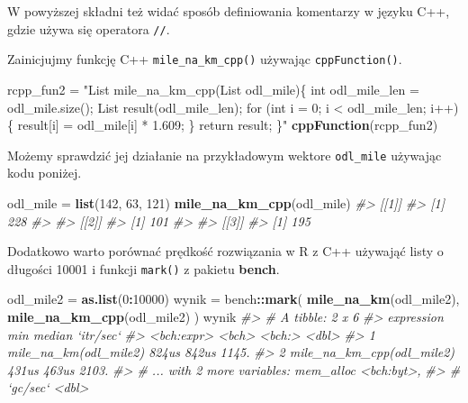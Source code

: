 \documentclass[paper=6in:9in,pagesize=pdftex,headinclude=on,footinclude=on,10pt]{scrbook}
\newenvironment{Shaded}{\begin{snugshade}}{\end{snugshade}}
\newcommand{\CommentTok}[1]{\textcolor[rgb]{0.56,0.35,0.01}{\textit{#1}}}
\newcommand{\DecValTok}[1]{\textcolor[rgb]{0.00,0.00,0.81}{#1}}
\newcommand{\KeywordTok}[1]{\textcolor[rgb]{0.13,0.29,0.53}{\textbf{#1}}}
\newcommand{\NormalTok}[1]{#1}
\newcommand{\OperatorTok}[1]{\textcolor[rgb]{0.81,0.36,0.00}{\textbf{#1}}}
\newcommand{\StringTok}[1]{\textcolor[rgb]{0.31,0.60,0.02}{#1}}
\begin{document}
W powyższej składni też widać sposób definiowania komentarzy w języku C++, gdzie używa się operatora \texttt{//}.

Zainicjujmy funkcję C++ \texttt{mile\_na\_km\_cpp()} używając \texttt{cppFunction()}.

\begin{Shaded}
\begin{Highlighting}[]
\NormalTok{rcpp_fun2 =}\StringTok{ "List mile_na_km_cpp(List odl_mile)\{}
\StringTok{  int odl_mile_len = odl_mile.size();}
\StringTok{  List result(odl_mile_len);}
\StringTok{  for (int i = 0; i < odl_mile_len; i++)\{}
\StringTok{    result[i] = odl_mile[i] * 1.609;}
\StringTok{  \}}
\StringTok{  return result;}
\StringTok{\}"}
\KeywordTok{cppFunction}\NormalTok{(rcpp_fun2)}
\end{Highlighting}
\end{Shaded}

Możemy sprawdzić jej działanie na przykładowym wektore \texttt{odl\_mile} używając kodu poniżej.

\begin{Shaded}
\begin{Highlighting}[]
\NormalTok{odl_mile =}\StringTok{ }\KeywordTok{list}\NormalTok{(}\DecValTok{142}\NormalTok{, }\DecValTok{63}\NormalTok{, }\DecValTok{121}\NormalTok{)}
\KeywordTok{mile_na_km_cpp}\NormalTok{(odl_mile)}
\CommentTok{#> [[1]]}
\CommentTok{#> [1] 228}
\CommentTok{#> }
\CommentTok{#> [[2]]}
\CommentTok{#> [1] 101}
\CommentTok{#> }
\CommentTok{#> [[3]]}
\CommentTok{#> [1] 195}
\end{Highlighting}
\end{Shaded}

Dodatkowo warto porównać prędkość rozwiązania w R z C++ używająć listy o długości 10001 i funkcji \texttt{mark()} z pakietu \textbf{bench}.

\begin{Shaded}
\begin{Highlighting}[]
\NormalTok{odl_mile2 =}\StringTok{ }\KeywordTok{as.list}\NormalTok{(}\DecValTok{0}\OperatorTok{:}\DecValTok{10000}\NormalTok{)}
\NormalTok{wynik =}\StringTok{ }\NormalTok{bench}\OperatorTok{::}\KeywordTok{mark}\NormalTok{(}
  \KeywordTok{mile_na_km}\NormalTok{(odl_mile2),}
  \KeywordTok{mile_na_km_cpp}\NormalTok{(odl_mile2)}
\NormalTok{)}
\NormalTok{wynik}
\CommentTok{#> # A tibble: 2 x 6}
\CommentTok{#>   expression                  min median `itr/sec`}
\CommentTok{#>   <bch:expr>                <bch> <bch:>     <dbl>}
\CommentTok{#> 1 mile_na_km(odl_mile2)     824us  842us     1145.}
\CommentTok{#> 2 mile_na_km_cpp(odl_mile2) 431us  463us     2103.}
\CommentTok{#> # ... with 2 more variables: mem_alloc <bch:byt>,}
\CommentTok{#> #   `gc/sec` <dbl>}
\end{Highlighting}
\end{Shaded}
\end{document}
